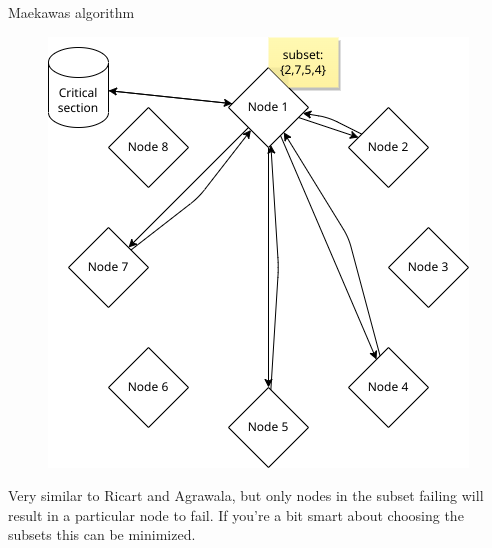 \documentclass[aspectratio=1610,17pt,utf8]{beamer}
\begin{document}
\begin{frame}{Maekawas algorithm}
    \begin{minipage}{.45\textwidth}
        \begin{figure}
            \includegraphics[width=\textwidth]{figures/1-maekawa.png}
        \end{figure}
    \end{minipage}
    \begin{minipage}{.5\textwidth}
        \tiny{Very similar to Ricart and Agrawala, but only nodes in the subset failing will result in a particular node to fail. If you're a bit smart about choosing the subsets this can be minimized.}
    \end{minipage}
\end{frame}
\end{document}
